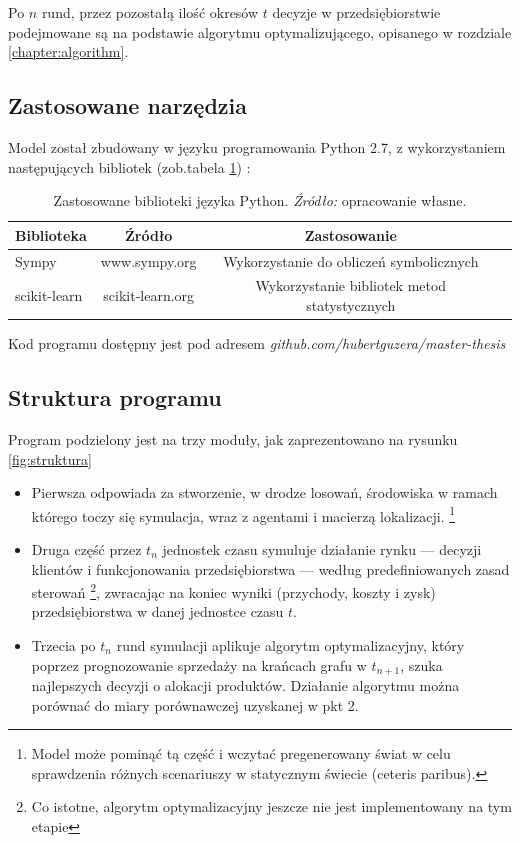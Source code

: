\documentclass[polish, twoside, 12pt, a4paper]{article}
\theoremstyle{definition}
\theoremstyle{plain}
\theoremstyle{remark}
\begin{document}
Po $n$ rund, przez pozostałą ilość okresów $t$ decyzje w przedsiębiorstwie podejmowane są na podstawie algorytmu optymalizującego, opisanego w rozdziale \ref{chapter:algorithm}. 

\subsection{Zastosowane narzędzia}

Model został zbudowany w języku programowania Python 2.7, z wykorzystaniem następujących bibliotek (zob.tabela \ref{tab:biblioteki}) : 

\begin{table}[hbt]
  \centering
  \captionsetup{margin=10pt,font=small,labelfont=bf,width=.8\textwidth}
  \caption[Zastosowane biblioteki języka Python]{Zastosowane biblioteki języka Python. \textit{Źródło:} opracowanie własne.}
  \label{tab:biblioteki}
\vspace*{2ex}
  \begin{tabular}{lccc}
 Biblioteka & Źródło & Zastosowanie \\ 
\hline
 Sympy & www.sympy.org & Wykorzystanie do obliczeń symbolicznych \\  
 scikit-learn & scikit-learn.org & Wykorzystanie bibliotek metod statystycznych \\ \hline
  \end{tabular}
\end{table}


Kod programu dostępny jest pod adresem  \textit{github.com/hubertguzera/master-thesis}

\subsection{Struktura programu}

Program podzielony jest na trzy moduły, jak zaprezentowano na rysunku \ref{fig:struktura}

	\begin{itemize}
		\item Pierwsza odpowiada za stworzenie, w drodze losowań, środowiska w ramach którego toczy się symulacja, wraz z agentami i macierzą lokalizacji. \footnote{Model może pominąć tą część i wczytać pregenerowany świat w celu sprawdzenia różnych scenariuszy w statycznym świecie (ceteris paribus).}
		\item  Druga część przez $t_n$ jednostek czasu symuluje działanie rynku --- decyzji klientów i funkcjonowania przedsiębiorstwa --- według predefiniowanych zasad sterowań \footnote{Co istotne, algorytm optymalizacyjny jeszcze nie jest implementowany na tym etapie}, zwracając na koniec wyniki (przychody, koszty i zysk) przedsiębiorstwa w danej jednostce czasu $t$.
		\item Trzecia po $t_n$ rund symulacji aplikuje algorytm optymalizacyjny, który poprzez prognozowanie sprzedaży na krańcach grafu w $t_{n+1}$, szuka najlepszych decyzji o alokacji produktów. Działanie algorytmu można porównać do miary porównawczej uzyskanej w pkt 2. 
	\end{itemize}
\end{document}
